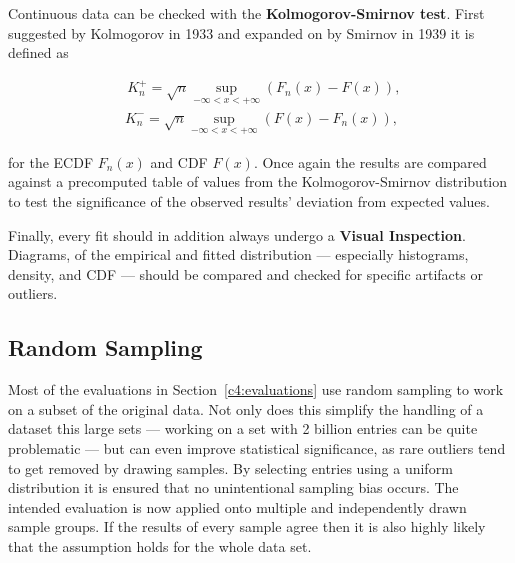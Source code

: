 Continuous data can be checked with the \textbf{Kolmogorov-Smirnov test}. First suggested by Kolmogorov in 1933 \cite{kolmogorov1933sulla} and expanded on by Smirnov in 1939 \cite{smirnov1939estimation} it is defined as

\begin{equation}
	\begin{aligned}
	\phantom{,}K_n^+ = \sqrt{n} \sup_{-\infty < x < + \infty} \left( F_n(x) - F(x) \right)\text{,} \\
	\phantom{.}K_n^- = \sqrt{n} \sup_{-\infty < x < + \infty} \left( F(x) - F_n(x) \right)\text{,}
	\end{aligned}
\end{equation}

for the \gls{ECDF} $F_n(x)$ and \gls{CDF} $F(x)$. Once again the results are compared against a precomputed table of values from the Kolmogorov-Smirnov distribution to test the significance of the observed results' deviation from expected values. 

Finally, every fit should in addition always undergo a \textbf{Visual Inspection}. Diagrams, of the empirical and fitted distribution --- especially histograms, density, and \gls{CDF} --- should be compared and checked for specific artifacts or outliers. 



\subsection{Random Sampling}

Most of the evaluations in Section~\ref{c4:evaluations} use random sampling to work on a subset of the original data.  Not only does this simplify the handling of a dataset this large sets --- working on a set with 2 billion entries can be quite problematic --- but can even improve statistical significance, as rare outliers tend to get removed by drawing samples. By selecting entries using a uniform distribution it is ensured that no unintentional sampling bias occurs. The intended evaluation is now applied onto multiple and independently drawn sample groups. If the results of every sample agree then it is also highly likely that the assumption holds for the whole data set.

